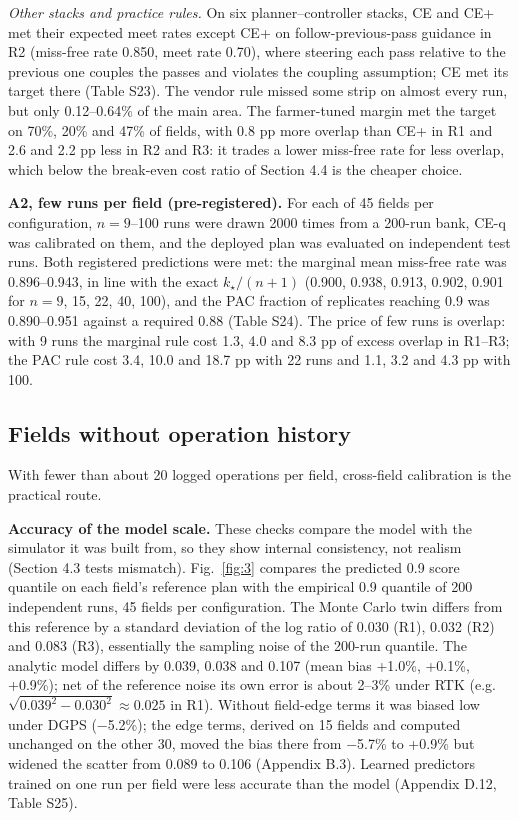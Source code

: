 \documentclass[preprint,12pt,authoryear]{elsarticle}
\begin{document}
\emph{Other stacks and practice rules.} On six planner--controller stacks, CE and CE+ met their expected meet rates except CE+ on follow-previous-pass guidance in R2 (miss-free rate 0.850, meet rate 0.70), where steering each pass relative to the previous one couples the passes and violates the coupling assumption; CE met its target there (Table S23). The vendor rule missed some strip on almost every run, but only 0.12--0.64\% of the main area. The farmer-tuned margin met the target on 70\%, 20\% and 47\% of fields, with 0.8 pp more overlap than CE+ in R1 and 2.6 and 2.2 pp less in R2 and R3: it trades a lower miss-free rate for less overlap, which below the break-even cost ratio of Section 4.4 is the cheaper choice.

\textbf{A2, few runs per field (pre-registered).} For each of 45 fields per configuration, \(n=9\)--100 runs were drawn 2000 times from a 200-run bank, CE-q was calibrated on them, and the deployed plan was evaluated on independent test runs. Both registered predictions were met: the marginal mean miss-free rate was 0.896--0.943, in line with the exact \(k_\star/(n+1)\) (0.900, 0.938, 0.913, 0.902, 0.901 for \(n=9\), 15, 22, 40, 100), and the PAC fraction of replicates reaching 0.9 was 0.890--0.951 against a required 0.88 (Table S24). The price of few runs is overlap: with 9 runs the marginal rule cost 1.3, 4.0 and 8.3 pp of excess overlap in R1--R3; the PAC rule cost 3.4, 10.0 and 18.7 pp with 22 runs and 1.1, 3.2 and 4.3 pp with 100.

\subsection{Fields without operation history}

With fewer than about 20 logged operations per field, cross-field calibration is the practical route.

\textbf{Accuracy of the model scale.} These checks compare the model with the simulator it was built from, so they show internal consistency, not realism (Section 4.3 tests mismatch). Fig.~\ref{fig:3} compares the predicted 0.9 score quantile on each field's reference plan with the empirical 0.9 quantile of 200 independent runs, 45 fields per configuration. The Monte Carlo twin differs from this reference by a standard deviation of the log ratio of 0.030 (R1), 0.032 (R2) and 0.083 (R3), essentially the sampling noise of the 200-run quantile. The analytic model differs by 0.039, 0.038 and 0.107 (mean bias +1.0\%, +0.1\%, +0.9\%); net of the reference noise its own error is about 2--3\% under RTK (e.g.~\(\sqrt{0.039^2-0.030^2}\approx0.025\) in R1). Without field-edge terms it was biased low under DGPS (−5.2\%); the edge terms, derived on 15 fields and computed unchanged on the other 30, moved the bias there from −5.7\% to +0.9\% but widened the scatter from 0.089 to 0.106 (Appendix B.3). Learned predictors trained on one run per field were less accurate than the model (Appendix D.12, Table S25).
\end{document}
